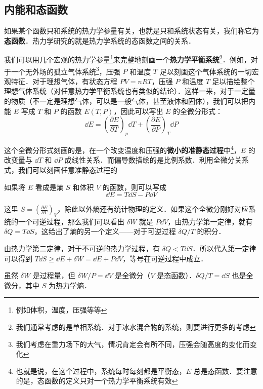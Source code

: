 
\subsection{内能和态函数}
如果某个函数只和系统的热力学参量有关，也就是只和系统状态有关，我们称它为\textbf{态函数}．热力学研究的就是热力学系统的态函数之间的关系．

我们可以用几个宏观的热力学参量\footnote{例如体积，温度，压强等等}来完整地刻画一个\textbf{热力学平衡系统}\footnote{我们通常考虑的是单相系统．对于冰水混合物的系统，则要进行更多的考虑}．例如，对于一个无外场的孤立气体系统\footnote{我们考虑在重力场下的大气，情况肯定会有所不同，压强会随高度的变化而变化}，压强 $P$ 和温度 $T$ 足以刻画这个气体系统的一切宏观特征．对于理想气体，有状态方程 $PV=nRT$，压强 $P$ 和温度 $T$ 足以描绘整个理想气体系统（对任意热力学平衡系统也有类似的结论）．这样一来，对于一定量的物质（不一定是理想气体，可以是一般气体，甚至液体和固体），我们可以把内能 $E$ 写成 $T$ 和 $P$ 的函数 $E(T,P)$，因此可以写出 $E$ 的全微分形式：
\begin{equation}
\dd E=\left(\frac{\partial E}{\partial T}\right)_p \dd T + \left(\frac{\partial E}{\partial P}\right)_T \dd P
\end{equation}

这个全微分形式刻画的是，在一个改变温度和压强的\textbf{微小的准静态过程}中\footnote{也就是说，在这个过程中，系统每时每刻都是平衡态，$E$ 总是态函数．要注意的是，态函数的定义只对一个热力学平衡系统有效}，$E$ 的改变量与 $\dd T$ 和 $\dd P$ 成线性关系．而偏导数描绘的是比例系数．利用全微分关系式，我们可以刻画任意准静态过程的

如果将 $E$ 看成是熵 $S$  和体积 $V$ 的函数，则可以写成
\begin{equation}
\dd E=T\dd S-P\dd V
\end{equation}

这里 $S=\left(\frac{\partial E}{\partial T}\right)_V$，除此以外熵还有统计物理的定义．如果这个全微分刚好对应系统的一个可逆过程，那么我们可以看出 $\delta W$ 就是 $P\dd V$，由热力学第一定律，就有 $\delta Q=T\dd S$，这给出了熵的另一个定义——对于可逆过程 $\delta Q/T$ 的积分．

由热力学第二定律，对于不可逆的热力学过程，有 $\delta Q<T\dd S$．所以代入第一定律可以得到 $T\dd S\ge \dd E+\delta W=\dd E+P\dd V$，等号在可逆过程中成立．





虽然 $\delta W$ 是过程量，但 $\delta W/P=\dd V$ 是全微分（$V$ 是态函数）．$\delta Q/T=\dd S$ 也是全微分，其中 $S$ 为热力学熵．




